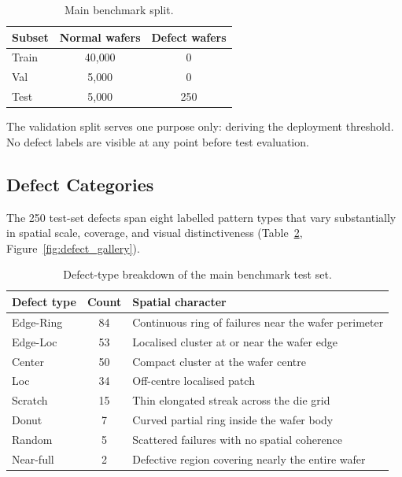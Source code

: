 \documentclass[11pt]{article}
\begin{document}
\begin{table}[H]
\centering
\caption{Main benchmark split.}
\label{tab:main_split}
\begin{tabular}{lcc}
\toprule
Subset & Normal wafers & Defect wafers \\
\midrule
Train   & 40{,}000 & 0   \\
Val     & 5{,}000  & 0   \\
Test    & 5{,}000  & 250 \\
\bottomrule
\end{tabular}
\end{table}

The validation split serves one purpose only: deriving the deployment
threshold. No defect labels are visible at any point before test evaluation.

\subsection{Defect Categories}

The 250 test-set defects span eight labelled pattern types that vary
substantially in spatial scale, coverage, and visual distinctiveness
(Table~\ref{tab:defect_types}, Figure~\ref{fig:defect_gallery}).

\begin{table}[H]
\centering
\caption{Defect-type breakdown of the main benchmark test set.}
\label{tab:defect_types}
\begin{tabularx}{\linewidth}{lc>{\raggedright\arraybackslash}X}
\toprule
Defect type & Count & Spatial character \\
\midrule
Edge-Ring & 84  & Continuous ring of failures near the wafer perimeter \\
Edge-Loc  & 53  & Localised cluster at or near the wafer edge \\
Center    & 50  & Compact cluster at the wafer centre \\
Loc       & 34  & Off-centre localised patch \\
Scratch   & 15  & Thin elongated streak across the die grid \\
Donut     & 7   & Curved partial ring inside the wafer body \\
Random    & 5   & Scattered failures with no spatial coherence \\
Near-full & 2   & Defective region covering nearly the entire wafer \\
\bottomrule
\end{tabularx}
\end{table}
\end{document}
